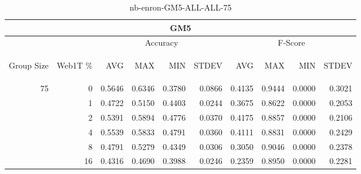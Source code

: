 \begin{center}
\begin{table}[htbp]
\begin{tabular}{ | r | r | r | r | r | r | r | r | r | r |}
\hline
\multicolumn{10}{|c|}{GM5}\\
\hline
 & & \multicolumn{4}{|c|}{Accuracy} & \multicolumn{4}{|c|}{F-Score}\\ \cline{3-10}
\begin{sideways}Group Size\end{sideways} & \begin{sideways}Web1T \%\end{sideways} & \begin{sideways}AVG\end{sideways} & \begin{sideways}MAX\end{sideways} & \begin{sideways}MIN\end{sideways} & \begin{sideways}STDEV\end{sideways} & \begin{sideways}AVG\end{sideways} & \begin{sideways}MAX\end{sideways} & \begin{sideways}MIN\end{sideways} & \begin{sideways}STDEV\end{sideways}\\
\hline
\multirow{6}{*}{75}
 & 0 & 0.5646 & 0.6346 & 0.3780 & 0.0866 & 0.4135 & 0.9444 & 0.0000 & 0.3021\\ \cline{2-10}
 & 1 & 0.4722 & 0.5150 & 0.4403 & 0.0244 & 0.3675 & 0.8622 & 0.0000 & 0.2053\\ \cline{2-10}
 & 2 & 0.5391 & 0.5894 & 0.4776 & 0.0370 & 0.4175 & 0.8857 & 0.0000 & 0.2106\\ \cline{2-10}
 & 4 & 0.5539 & 0.5833 & 0.4791 & 0.0360 & 0.4111 & 0.8831 & 0.0000 & 0.2429\\ \cline{2-10}
 & 8 & 0.4791 & 0.5279 & 0.4349 & 0.0306 & 0.3050 & 0.9046 & 0.0000 & 0.2378\\ \cline{2-10}
 & 16 & 0.4316 & 0.4690 & 0.3988 & 0.0246 & 0.2359 & 0.8950 & 0.0000 & 0.2281\\ \cline{2-10}
\hline
\end{tabular}
\caption{nb-enron-GM5-ALL-ALL-75}
\end{table}
\end{center}

